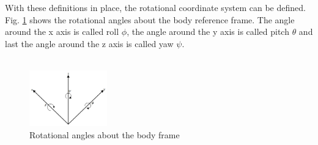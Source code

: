 With these definitions in place, the rotational coordinate system can be defined. Fig. \ref{fig:quadAngles} shows the rotational angles about the body reference frame. The angle around the x axis is called roll $\phi$, the angle around the y axis is called pitch $\theta$ and last the angle around the z axis is called yaw $\psi$.
\\\\
\begin{figure}[H]
    \centering
    \includegraphics[width = 0.3\textwidth]{VAPIQ-PICTURES/RPJ.jpg}
    \caption{Rotational angles about the body frame}
    \label{fig:quadAngles}
\end{figure}
\\\\
 
